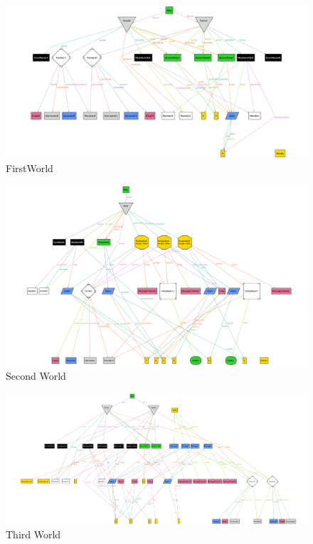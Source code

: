 \begin{figure}
    \begin{center}
          \includegraphics[width=1.2\textwidth]{alloy/world1.png}
          \caption{FirstWorld}
        \label{fig:world1}
    \end{center}
\end{figure}


\begin{figure}
    \begin{center}
          \includegraphics[width=1.2\textwidth]{alloy/world2.png}
          \caption{Second World}
        \label{fig:world2}
    \end{center}
\end{figure}

\begin{figure}
    \begin{center}
          \includegraphics[width=1.2\textwidth]{alloy/world3.png}
          \caption{Third World}
        \label{fig:world3}
    \end{center}
\end{figure}

